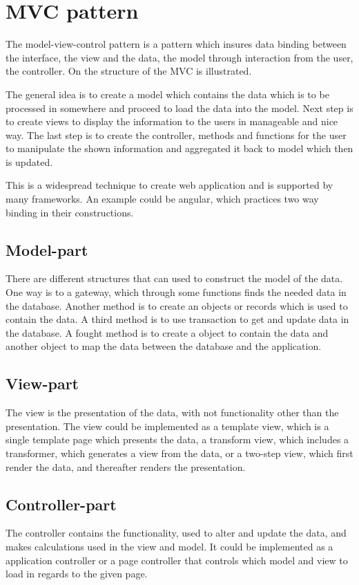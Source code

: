 \section{MVC pattern}
The model-view-control pattern is a pattern which insures data binding between the interface, the view and the data, the model through interaction from the user, the controller. On  the structure of the MVC is illustrated.


The general idea is to create a model which contains the data which is to be processed in somewhere and proceed to load the data into the model.
Next step is to create views to display the information to the users in manageable and nice way. The last step is to create the controller, methods and functions for the user to manipulate the shown information and aggregated it back to model which then is updated.

This is a widespread technique to create web application and is supported by many frameworks. An example could be angular, which practices two way binding in their constructions.

\subsection{Model-part}
There are different structures that can used to construct the model of the data. One way is to a gateway, which through some functions finds the needed data in the database. Another method is to create an objects or records which is used to contain the data. A third method is to use transaction to get and update data in the database. A fought method is to create a object to contain the data and another object to map the data between the database and the application.

\subsection{View-part}
The view is the presentation of the data, with not functionality other than the presentation. The view could be implemented as a template view, which is a single template page which presents the data, a transform view, which includes a transformer, which generates a view from the data, or a two-step view, which first render the data, and thereafter renders the presentation.

\subsection{Controller-part}
The controller contains the functionality, used to alter and update the data, and makes calculations used in the view and model. It could be implemented as a application controller or a page controller that controls which model and view to load in regards to the given page.